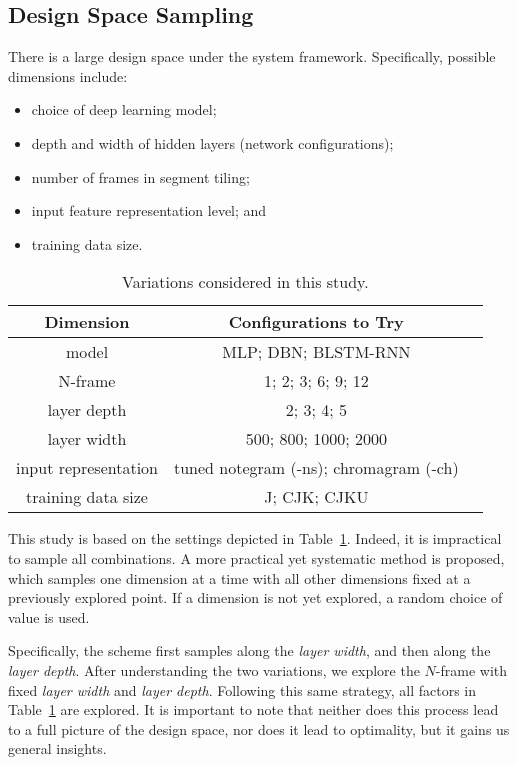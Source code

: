 \subsection{Design Space Sampling}
There is a large design space under the system framework. Specifically, possible dimensions include:
\begin{itemize}
\item choice of deep learning model; 
\item depth and width of hidden layers (network configurations);
\item number of frames in segment tiling;
\item input feature representation level; and
\item training data size.
\end{itemize}


\begin{table}
\caption{Variations considered in this study.}
\centering
\footnotesize
\begin{tabular}{|c|c|c|} \hline
Dimension & Configurations to Try \\ \hline
model & MLP; DBN; BLSTM-RNN \\ \hline
N-frame & 1; 2; 3; 6; 9; 12 \\ \hline
layer depth & 2; 3; 4; 5 \\ \hline
layer width & 500; 800; 1000; 2000 \\ \hline
input representation & tuned notegram (-ns); chromagram (-ch) \\ \hline
training data size & J; CJK; CJKU \\ \hline
\end{tabular}
\label{tab:3-varexplore}
\end{table}

This study is based on the settings depicted in Table~\ref{tab:3-varexplore}. Indeed, it is impractical to sample all combinations. A more practical yet systematic method is proposed, which samples one dimension at a time with all other dimensions fixed at a previously explored point. If a dimension is not yet explored, a random choice of value is used.

Specifically, the scheme first samples along the {\it layer width}, and then along the {\it layer depth}. After understanding the two variations, we explore the $N$-frame with fixed {\it layer width} and {\it layer depth}. Following this same strategy, all factors in Table~\ref{tab:3-varexplore} are explored. It is important to note that neither does this process lead to a full picture of the design space, nor does it lead to optimality, but it gains us general insights.

